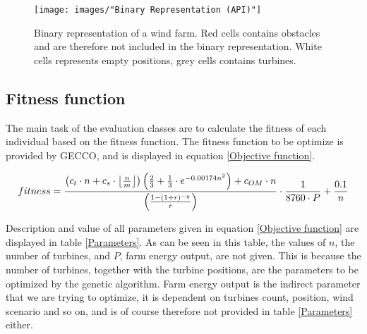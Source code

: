 \begin{figure}[h!]
\begin{center}
\texttt{[image: images/"Binary Representation (API)"]}
\caption{Binary representation of a wind farm. Red cells contains obstacles and are therefore not included in the binary representation. White cells represents empty positions, grey cells contains turbines.}
\label{Binary Representation (API)}
\end{center}
\end{figure}


\subsection{Fitness function}\label{subsection:fitnessfunction}


The main task of the evaluation classes are to calculate the fitness of each individual based on the fitness function.  The fitness function to be optimize is provided by GECCO, and is displayed in equation \ref{Objective function}.\\

\begin{small}
\begin{equation}
fitness =  \frac{ \left( c_t \cdot n + c_s \cdot \floor*{\frac{n}{m}} \right) \left( \frac{2}{3} + \frac{1}{3} \cdot e^{-0.00174n^2} \right) + c_{OM} \cdot n}{\left( \frac{1 - (1 + r)^{-y}}{r} \right) } \cdot \frac{1}{8760 \cdot P} + \frac{0.1}{n}
\label{Objective function} 
\end{equation}
\end{small}


\noindent Description and value of all parameters given in equation \ref{Objective function} are displayed in table \ref{Parameters}. As can be seen in this table, the values of $n$, the number of turbines, and $P$, farm energy output, are not given. This is because the number of turbines, together with the turbine positions, are the parameters to be optimized by the genetic algorithm. Farm energy output is the indirect parameter that we are trying to optimize, it is dependent on turbines count, position, wind scenario and so on, and is of course therefore not provided in table \ref{Parameters} either.\\


